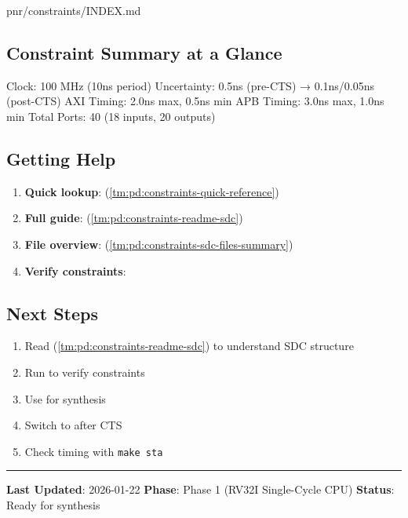 \begin{relocated}{pnr/constraints/INDEX.md}
\subsection{Constraint Summary at a Glance}\label{tm:pd:constraints-index:constraint-summary-at-a-glance}

\begin{textblock}
Clock:        100 MHz (10ns period)
Uncertainty:  0.5ns (pre-CTS) → 0.1ns/0.05ns (post-CTS)
AXI Timing:   2.0ns max, 0.5ns min
APB Timing:   3.0ns max, 1.0ns min
Total Ports:  40 (18 inputs, 20 outputs)
\end{textblock}

\subsection{Getting Help}\label{tm:pd:constraints-index:getting-help}

\begin{enumerate}
\def\labelenumi{\arabic{enumi}.}
\tightlist
\item
  \textbf{Quick lookup}:  (\cref{tm:pd:constraints-quick-reference})
\item
  \textbf{Full guide}:  (\cref{tm:pd:constraints-readme-sdc})
\item
  \textbf{File overview}:  (\cref{tm:pd:constraints-sdc-files-summary})
\item
  \textbf{Verify constraints}: 
\end{enumerate}

\subsection{Next Steps}\label{tm:pd:constraints-index:next-steps}

\begin{enumerate}
\def\labelenumi{\arabic{enumi}.}
\tightlist
\item
  \ok{} Read  (\cref{tm:pd:constraints-readme-sdc}) to understand SDC structure
\item
  \ok{} Run  to verify constraints
\item
  \ok{} Use  for synthesis
\item
  \ok{} Switch to  after CTS
\item
  \ok{} Check timing with \texttt{make\ sta}
\end{enumerate}

\begin{center}\rule{0.5\linewidth}{0.5pt}\end{center}

\textbf{Last Updated}: 2026-01-22 \textbf{Phase}: Phase 1 (RV32I
Single-Cycle CPU) \textbf{Status}: Ready for synthesis
\end{relocated}

